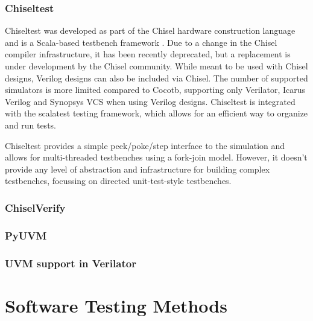 \documentclass[12pt]{report}
\begin{document}
\subsubsection{Chiseltest} %

Chiseltest was developed as part of the Chisel hardware construction language and is a Scala-based testbench
framework \cite{chiseltest}. Due to a change in the Chisel compiler infrastructure, it has been recently deprecated,
but a replacement is under development by the Chisel community. While meant to be used with Chisel designs, Verilog
designs can also be included via Chisel. The number of supported simulators is more limited compared to Cocotb,
supporting only Verilator, Icarus Verilog and Synopsys VCS when using Verilog designs. Chiseltest is integrated with
the scalatest testing framework, which allows for an efficient way to organize and run tests.

Chiseltest provides a simple peek/poke/step interface to the simulation and allows for multi-threaded testbenches
using a fork-join model. However, it doesn't provide any level of abstraction and infrastructure for building complex
testbenches, focussing on directed unit-test-style testbenches.

\subsubsection{ChiselVerify} %

\subsubsection{PyUVM} %

\subsubsection{UVM support in Verilator} %

\section{Software Testing Methods} %
\end{document}
